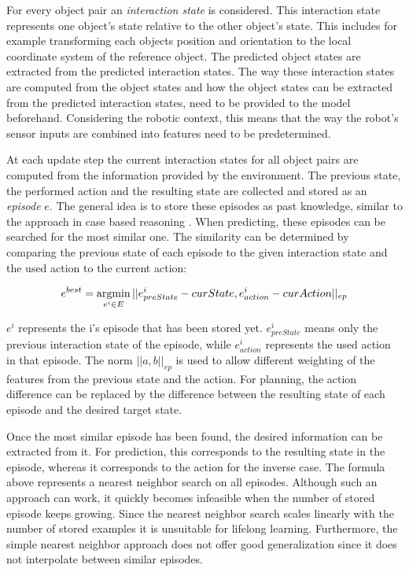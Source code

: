 For every object pair an \textit{interaction state} is considered. This interaction state represents one object's state relative to the other object's state. This includes for example transforming each objects position and orientation to the local coordinate system of the reference object. %
The predicted object states are extracted from the predicted interaction states. The way these interaction states are computed from the object states and how the object states can be extracted from the predicted interaction states, need to be provided to the model beforehand. Considering the robotic context, this means that the way the robot's sensor inputs are combined into features need to be predetermined.

At each update step the current interaction states for all object pairs are computed from the information provided by the environment. The previous state, the performed action and the resulting state are collected and stored as an \textit{episode} $e$. The general idea is to store these episodes as past knowledge, similar to the approach in case based reasoning \cite{cbr}. When predicting, these episodes can be searched for the most similar one. The similarity can be determined by comparing the previous state of each episode to the given interaction state and the used action to the current action:

\begin{equation}
e^{best} = \argmin_{e^i \in E} ||e^i_{preState}-curState, e^i_{action}-curAction||_{ep}
\label{eq:bestEpisode}
\end{equation}


$e^i$ represents the i's episode that has been stored yet. $e^i_{preState}$ means only the previous interaction state of the episode, while $e^i_{action}$ represents the used action in that episode.
The norm $||a,b||_{ep}$ is used to allow different weighting of the features from the previous state and the action. For planning, the action difference can be replaced by the difference between the resulting state of each episode and the desired target state.

Once the most similar episode has been found, the desired information can be extracted from it. For prediction, this corresponds to the resulting state in the episode, whereas it corresponds to the action for the inverse case. The formula above represents a nearest neighbor search on all episodes. Although such an approach can work, it quickly becomes infeasible when the number of stored episode keeps growing. Since the nearest neighbor search scales linearly with the number of stored examples it is unsuitable for lifelong learning. 
Furthermore, the simple nearest neighbor approach does not offer good generalization since it does not interpolate between similar episodes. 

